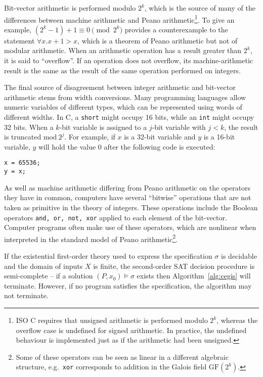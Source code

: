 \documentclass[a4paper]{llncs}
\begin{document}
Bit-vector arithmetic is performed modulo $2^k$, which is the source of many
of the differences between machine arithmetic and Peano
arithmetic\footnote{ISO C requires that unsigned arithmetic is performed
modulo $2^k$, whereas the overflow case is undefined for signed arithmetic. 
In practice, the undefined behaviour is implemented just as if the
arithmetic had been unsigned.}.  To give an example, $(2^k - 1) + 1 \equiv 0
\pmod {2^k}$ provides a counterexample to the statement $\forall x. 
x + 1 > x$, which is a theorem of Peano arithmetic but not of modular
arithmetic.  When an arithmetic operation has a result greater than $2^k$,
it is said to ``overflow''.  If an operation does not overflow, its
machine-arithmetic result is the same as the result of the same operation
performed on integers.

The final source of disagreement between integer arithmetic and bit-vector
arithmetic stems from width conversions.  Many programming languages allow
numeric variables of different types, which can be represented using words
of different widths.  In C, a \texttt{short} might occupy 16 bits, while an
\texttt{int} might occupy 32 bits.  When a $k$-bit variable is assigned to a
$j$-bit variable with $j < k$, the result is truncated $\mathrm{mod}~2^j$.  For
example, if $x$ is a 32-bit variable and $y$ is a 16-bit variable, $y$ will
hold the value $0$ after the following code is executed:
%
\begin{lstlisting}
x = 65536;
y = x;
\end{lstlisting}


As well as machine arithmetic differing from Peano arithmetic on the
operators they have in common, computers have several ``bitwise'' operations
that are not taken as primitive in the theory of integers.  These operations
include the Boolean operators \texttt{and, or, not, xor} applied to each
element of the bit-vector.  Computer programs often make use of these
operators, which are nonlinear when interpreted in the standard model of
Peano arithmetic\footnote{Some of these operators can be seen as
linear in a different algebraic structure, e.g.~\texttt{xor} corresponds to
addition in the Galois field $\mathrm{GF}(2^k)$.}.

\begin{theorem}
 \label{thm:synth-semicomplete}
 If the existential first-order theory used to express the specification $\sigma$ is decidable
 and the domain of inputs $X$ is finite,
 the second-order SAT decision procedure is semi-complete -- if a solution $(P, x_0) \models \sigma$
 exists then Algorithm~\ref{alg:cegis} will terminate.  However, if no program
 satisfies the specification, the algorithm may not terminate.
\end{theorem}
\end{document}
